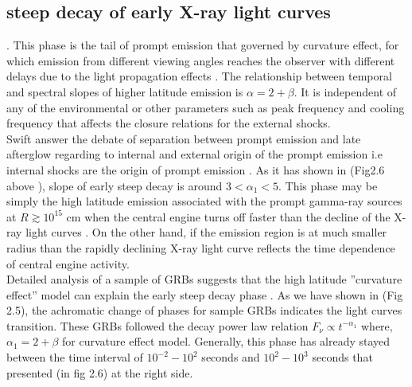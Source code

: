 \subsection{steep decay of early X-ray light curves}.
This phase is the tail of prompt emission that governed by curvature
effect, for which emission from different viewing angles reaches the observer with
different delays due to the light propagation effects \citep{33}. The relationship between temporal and spectral slopes of higher latitude emission is $\alpha  = 2 + \beta $. It is independent of any of the environmental or other parameters such as peak frequency and cooling frequency that affects the closure relations for the external shocks.\\
Swift answer the debate of separation between prompt emission and late afterglow
regarding to internal and external origin of the prompt emission i.e internal
shocks are the origin of prompt emission \citep{33}. As it has shown in (Fig2.6 above ), slope of early steep decay is around $3 < \alpha_{1} < 5$.
This phase may be simply the high latitude emission associated with the prompt
gamma-ray sources at $ R \gtrsim 10^{15} $ cm when the central engine turns off faster than the decline of the X-ray light curves . On the other hand, if the emission region is at much smaller radius than the rapidly declining X-ray light curve reflects the time dependence of central engine activity\citep{36}.\\
Detailed analysis of a sample of GRBs suggests that the high latitude ”curvature
effect” model can explain the early steep decay phase \citep{37}. As we have shown in
(Fig 2.5), the achromatic change of phases for sample GRBs indicates the light
curves transition. These GRBs followed the decay power law relation $ F_{\nu}\propto  t^{-\alpha_{1}} $ where, $ \alpha_{1}  = 2 + \beta $ for curvature effect model. Generally, this phase has already stayed between the time interval of $ 10^{-2}  - 10^{2} $ seconds and $ 10^{2} - 10^{3} $ seconds that  presented (in fig 2.6) at the right side.\\\ 

